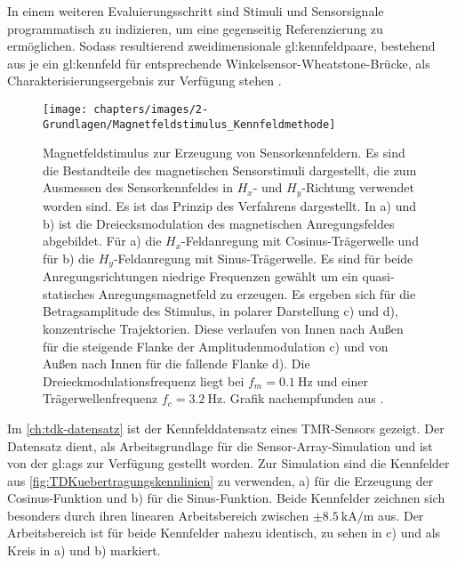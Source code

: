 \newline
In einem weiteren Evaluierungsschritt sind Stimuli und Sensorsignale programmatisch zu indizieren, um eine gegenseitig Referenzierung zu ermöglichen. Sodass resultierend zweidimensionale \gls{gl:kennfeldpaar}e, bestehend aus je ein \gls{gl:kennfeld} für entsprechende Winkelsensor-Wheatstone-Brücke, als Charakterisierungsergebnis zur Verfügung stehen \cite{Schuethe2019}.


\clearpage


\begin{figure}[tbph]
	\centering
	\texttt{[image: chapters/images/2-Grundlagen/Magnetfeldstimulus\_Kennfeldmethode]}
	\caption[Magnetfeldstimulus zur Erzeugung von Sensorkennfeldern]{Magnetfeldstimulus zur Erzeugung von 
		Sensorkennfeldern. Es sind die Bestandteile des magnetischen Sensorstimuli dargestellt, die zum Ausmessen des 
		Sensorkennfeldes in $H_x$- und $H_y$-Richtung verwendet worden sind. Es ist das Prinzip des Verfahrens 
		dargestellt. In a) und b) ist die Dreiecksmodulation des magnetischen Anregungsfeldes abgebildet. Für a) die 
		$H_x$-Feldanregung mit Cosinus-Trägerwelle und für b) die $H_y$-Feldanregung mit Sinus-Trägerwelle. Es sind für 
		beide Anregungsrichtungen niedrige Frequenzen gewählt um ein quasi-statisches Anregungsmagnetfeld zu erzeugen. 
		Es ergeben sich für die Betragsamplitude des Stimulus, in polarer Darstellung c) und d), konzentrische 
		Trajektorien. Diese verlaufen von Innen nach Außen für die steigende Flanke der Amplitudenmodulation c) und von 
		Außen nach Innen für die fallende Flanke d). Die Dreieckmodulationsfrequenz liegt bei $f_m = \SI{0.1}{\hertz}$ 
		und einer Trägerwellenfrequenz $f_c = \SI{3.2}{\hertz}$. Grafik nachempfunden aus \cite{Schuethe2019}.}
	\label{fig:magnetfeldstimuluskennfeldmethode}
\end{figure}


\clearpage


Im \autoref{ch:tdk-datensatz} ist der Kennfelddatensatz eines TMR-Sensors \cite{TDK2016} gezeigt. Der Datensatz dient, als Arbeitsgrundlage für die Sensor-Array-Simulation und ist von der \gls{gl:ags} zur Verfügung gestellt worden. Zur Simulation sind die Kennfelder aus \autoref{fig:TDKuebertragungskennlinien} zu verwenden, a) für die Erzeugung der Cosinus-Funktion und b) für die Sinus-Funktion. Beide Kennfelder zeichnen sich besonders durch ihren linearen Arbeitsbereich zwischen $\pm\SI{8,5}{\kilo\ampere\per\metre}$ aus. Der Arbeitsbereich ist für beide Kennfelder nahezu identisch, zu sehen in c) und als Kreis in a) und b) markiert. 


